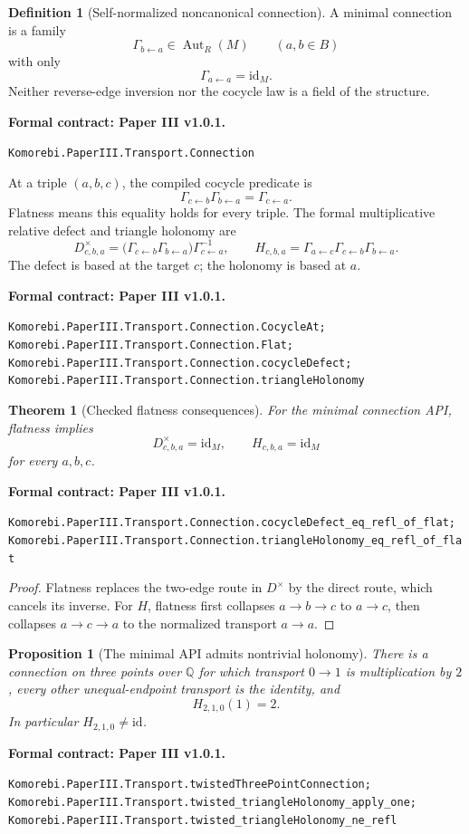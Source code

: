 \documentclass[11pt,a4paper]{article}
\newtheorem{theorem}{Theorem}[section]
\theoremstyle{plain}
\newtheorem{proposition}[proposition]{Proposition}
\theoremstyle{definition}
\newtheorem{definition}[definition]{Definition}
\theoremstyle{remark}
\newcommand{\id}{\mathrm{id}}
\newcommand{\leanname}[1]{\nolinkurl{#1}}
\newcommand{\statusleanthree}[1]{\par\smallskip\noindent\begin{minipage}{\linewidth}{\color{leanblue}\textbf{Formal contract: Paper III v1.0.1.}}\par\begingroup\small\raggedright\leanname{#1}\par\endgroup\end{minipage}\par\smallskip}
\begin{document}
\begin{definition}[Self-normalized noncanonical connection]
\label{def:minimal-connection}
A minimal connection is a family
\[
\Gamma_{b\leftarrow a}\in\operatorname{Aut}_R(M)
\qquad(a,b\in B)
\]
with only
\[
\Gamma_{a\leftarrow a}=\id_M.
\]
Neither reverse-edge inversion nor the cocycle law is a field of the
structure.
\end{definition}
\statusleanthree{Komorebi.PaperIII.Transport.Connection}

At a triple $(a,b,c)$, the compiled cocycle predicate is
\[
\Gamma_{c\leftarrow b}\Gamma_{b\leftarrow a}
=\Gamma_{c\leftarrow a}.
\]
Flatness means this equality holds for every triple.  The formal
multiplicative relative defect and triangle holonomy are
\[
D^\times_{c,b,a}
=
\bigl(\Gamma_{c\leftarrow b}\Gamma_{b\leftarrow a}\bigr)
\Gamma_{c\leftarrow a}^{-1},
\qquad
H_{c,b,a}
=
\Gamma_{a\leftarrow c}
\Gamma_{c\leftarrow b}
\Gamma_{b\leftarrow a}.
\]
The defect is based at the target $c$; the holonomy is based at $a$.
\statusleanthree{Komorebi.PaperIII.Transport.Connection.CocycleAt; Komorebi.PaperIII.Transport.Connection.Flat; Komorebi.PaperIII.Transport.Connection.cocycleDefect; Komorebi.PaperIII.Transport.Connection.triangleHolonomy}

\begin{theorem}[Checked flatness consequences]
\label{thm:minimal-flatness}
For the minimal connection API, flatness implies
\[
D^\times_{c,b,a}=\id_M,
\qquad
H_{c,b,a}=\id_M
\]
for every $a,b,c$.
\end{theorem}
\statusleanthree{Komorebi.PaperIII.Transport.Connection.cocycleDefect_eq_refl_of_flat; Komorebi.PaperIII.Transport.Connection.triangleHolonomy_eq_refl_of_flat}

\begin{proof}
Flatness replaces the two-edge route in $D^\times$ by the direct route,
which cancels its inverse.  For $H$, flatness first collapses $a\to b\to c$
to $a\to c$, then collapses $a\to c\to a$ to the normalized transport
$a\to a$.
\end{proof}

\begin{proposition}[The minimal API admits nontrivial holonomy]
\label{prop:twisted-loop}
There is a connection on three points over $\mathbb Q$ for which transport
$0\to1$ is multiplication by $2$, every other unequal-endpoint transport is
the identity, and
\[
H_{2,1,0}(1)=2.
\]
In particular $H_{2,1,0}\ne\id$.
\end{proposition}
\statusleanthree{Komorebi.PaperIII.Transport.twistedThreePointConnection; Komorebi.PaperIII.Transport.twisted_triangleHolonomy_apply_one; Komorebi.PaperIII.Transport.twisted_triangleHolonomy_ne_refl}
\end{document}
